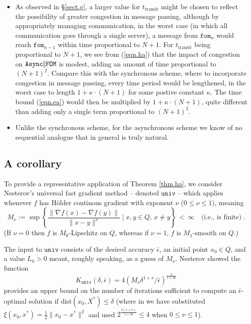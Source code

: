 \documentclass[reqno, 11pt]{amsart}
\numberwithin{equation}{section}
\newcommand{\shrink}[1]{ {\scriptstyle {\textstyle {#1} } } }
\newcommand{\smfrac}[2]{ \shrink{ \frac{#1}{#2} } }
\newcommand{\nt}{\negthinspace}
\newcommand{\fom}{\mathtt{fom}}
\newcommand{\parfom}{\parallel \nt \nt  \mathtt{FOM}}
\newcommand{\univ}{\mathtt{univ}}
\newcommand{\ttransit}{t_{\mathrm{transit}}}
\newcommand{\aparfom}{\mathtt{Async} \nt \nt \parfom}
\newcommand{\grad}{\nabla}
\newcommand{\dist}{\mathrm{dist}}
\begin{document}
 

\begin{itemize}

\item As observed in \S\ref{sect.g}, a larger value for $ \ttransit $ might be chosen to reflect the possibility of greater congestion in message passing, although by appropriately managing communication, in the worst case (in which all communication goes through a single server), a message from $ \fom_n $ would reach $ \fom_{n-1} $ within time proportional to $ N+1 $.  For $ \ttransit $ being proportional to $ N+1 $, we see from (\ref{eqn.ha})  that the impact of congestion on $ \aparfom $ is modest, adding an amount of time proportional to $ (N+1)^2 $.  Compare this with the synchronous scheme, where to incorporate congestion in message passing, every time period would be lengthened, in the worst case to length $ 1 + \kappa \cdot   (N+1) $ for some postive constant $ \kappa  $. The time bound (\ref{eqn.ea})  would then be multiplied by $ 1 + \kappa \cdot   (N+1) $, quite different than adding only a single term proportional to $ (N+1)^2 $.
\item Unlike the synchronous scheme, for the asynchronous scheme we know of no sequential analogue that in general is truly natural. 
\end{itemize}
  



\subsection{A corollary} \label{sect.hb} 
To provide a representative application of Theorem \ref{thm.ha}, we consider Nesterov's universal fast gradient method \cite[\S4]{nesterov2015universal}-- denoted $ \univ $ -- which applies whenever $ f $ has H\"{o}lder continous gradient with exponent $ \nu $ ($ 0 \leq \nu \leq 1 $), meaning
\[  M_{\nu} := \sup \left\{ \smfrac{ \| \grad f(x) - \grad f(y) \| }{ \| x - y \|^{ \nu}} \mid x,y \in Q, \, x \neq y \right\} \,  < \, \infty \quad \textrm{(i.e., is finite)} \; .  \]
(If $ \nu = 0 $ then $ f $ is $ M_0 $-Lipschitz on $ Q $, whereas if $ \nu = 1 $, $ f $ is $ M_1 $-smooth on $ Q $.)


The input to $ \univ $  consists of the desired accuracy $ \bar{\epsilon}  $, an initial point $ x_0 \in Q $, and a value $ L_0  > 0 $ meant, roughly speaking, as a guess of $ M_{\nu} $. 
Nesterov \cite[(4.5)]{nesterov2015universal} showed the function 
\begin{equation}  \label{eqn.hb} 
   K_{\univ}(\delta, \bar{\epsilon} ) =  4 \left(  M_{\nu} \delta^{1 + \nu}/ \bar{\epsilon}  \right)^{\frac{2}{1 + 3 \nu}} 
   \end{equation} 
   provides an upper bound on the number of iterations sufficient to compute an $ \bar{\epsilon}$-optimal solution if $ \dist(x_0, X^*) \leq \delta $ (where in \cite[(4.5)]{nesterov2015universal} we have substituted $ \xi(x_0,x^*) = \frac{1}{2} \| x_0 - x^* \|^2 $ and used $ 2^{ \frac{2(1 + \nu)}{1 + 3 \nu }} \leq 4 $ when $ 0 \leq \nu \leq 1 $).
    
\end{document}
